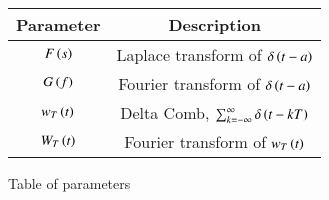 \renewcommand\thetable{1}
\begin{tabular}{|c|c|}
    \hline 
    \textbf{Parameter}&\textbf{Description} \\
    \hline
    $F\left(s\right)$ & Laplace transform of $\delta\left(t - a\right)$ \\
    \hline
    $G\left(f\right)$ & Fourier transform of $\delta\left(t - a\right)$ \\
    \hline
    $w_T\left(t\right)$ & Delta Comb, $\sum_{k = -\infty}^{\infty}\delta\left(t - kT\right)$ \\
    \hline
    $W_T\left(t\right)$ & Fourier transform of $w_T\left(t\right)$ \\
    \hline
\end{tabular}

\caption{Table of parameters}
\label{Table:2022.ME.3.1}

